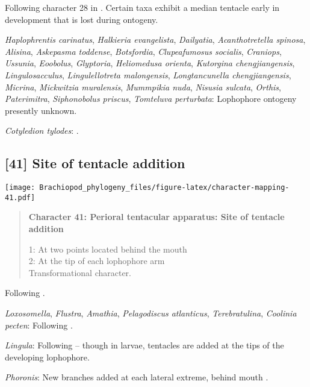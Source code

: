 \documentclass[openany]{book}
\theoremstyle{definition}
\theoremstyle{definition}
\theoremstyle{definition}
\theoremstyle{remark}
\begin{document}
Following character 28 in \citet{Carlson1995Phylogeneticrelationships}.
Certain taxa exhibit a median tentacle early in development that is lost
during ontogeny.

\hypertarget{Acanthotretella_spinosa-coding-40}{}
\emph{Haplophrentis carinatus}, \emph{Halkieria evangelista},
\emph{Dailyatia}, \emph{Acanthotretella spinosa}, \emph{Alisina},
\emph{Askepasma toddense}, \emph{Botsfordia}, \emph{Clupeafumosus
socialis}, \emph{Craniops}, \emph{Ussunia}, \emph{Eoobolus},
\emph{Glyptoria}, \emph{Heliomedusa orienta}, \emph{Kutorgina
chengjiangensis}, \emph{Lingulosacculus}, \emph{Lingulellotreta
malongensis}, \emph{Longtancunella chengjiangensis}, \emph{Micrina},
\emph{Mickwitzia muralensis}, \emph{Mummpikia nuda}, \emph{Nisusia
sulcata}, \emph{Orthis}, \emph{Paterimitra}, \emph{Siphonobolus
priscus}, \emph{Tomteluva perturbata}: Lophophore ontogeny presently
unknown.

\hypertarget{Cotyledion_tylodes-coding-40}{}
\emph{Cotyledion tylodes}: \citet{Nielsen1966}.

\subsection*{{[}41{]} Site of tentacle
addition}\label{site-of-tentacle-addition}

\texttt{[image: Brachiopod\_phylogeny\_files/figure-latex/character-mapping-41.pdf]}

\begin{quote}
\textbf{Character 41: Perioral tentacular apparatus: Site of tentacle
addition}

1: At two points located behind the mouth\\
2: At the tip of each lophophore arm\\
Transformational character.
\end{quote}

Following \citet{Temereva2017Innervationof}.

\hypertarget{Amathia-coding-41}{}
\emph{Loxosomella}, \emph{Flustra}, \emph{Amathia}, \emph{Pelagodiscus
atlanticus}, \emph{Terebratulina}, \emph{Coolinia pecten}: Following
\citet{Temereva2017Innervationof}.

\hypertarget{Lingula-coding-41}{}
\emph{Lingula}: Following \citet{Temereva2017Innervationof} -- though in
larvae, tentacles are added at the tips of the developing lophophore.

\hypertarget{Phoronis-coding-41}{}
\emph{Phoronis}: New branches added at each lateral extreme, behind
mouth \citep{Adrianov2006}.
\end{document}
